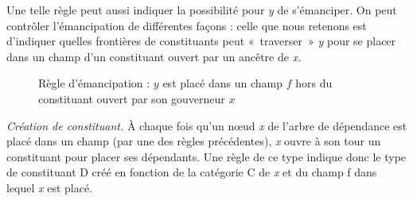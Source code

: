     Une telle règle peut aussi indiquer la possibilité pour \textit{y} de s’émanciper. On peut contrôler l’émancipation de différentes façons : celle que nous retenons est d’indiquer quelles frontières de constituants peut «~traverser~» \textit{y} pour se placer dans un champ d’un constituant ouvert par un ancêtre de \textit{x.}
    
    \begin{figure}
    \caption{Règle d'émancipation : $y$ est placé dans un champ $f$ hors du constituant ouvert par son gouverneur $x$}
    \end{figure}

    \item \textit{Création de constituant.} À chaque fois qu’un nœud \textit{x} de l’arbre de dépendance est placé dans un champ (par une des règles précédentes), \textit{x} ouvre à son tour un constituant pour placer ses dépendants. Une règle de ce type indique donc le type de constituant D créé en fonction de la catégorie C de \textit{x} et du champ f dans lequel \textit{x} est placé.

